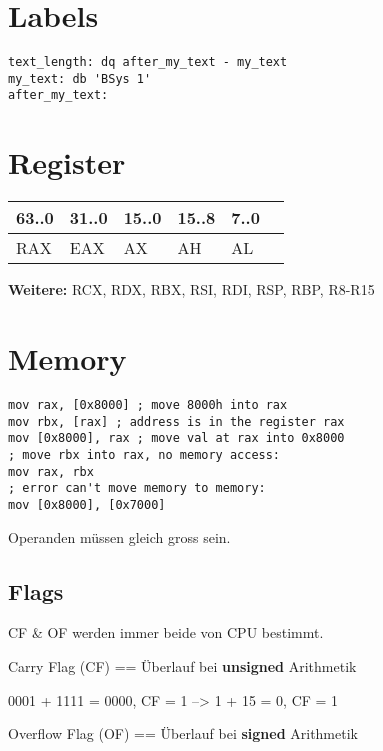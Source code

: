 \begin{multicols*}{4}
\section{Labels}
\begin{lstlisting}[language={[x86masm]Assembler}]
text_length: dq after_my_text - my_text
my_text: db 'BSys 1'
after_my_text:
\end{lstlisting}

\section{Register}
\begin{tabular}{llllll}
    63..0 & 31..0 & 15..0 & 15..8 & 7..0\\
    \hline
    RAX & EAX & AX & AH & AL\\
\end{tabular}

\textbf{Weitere:} RCX, RDX, RBX, RSI, RDI, RSP, RBP, R8-R15


\section{Memory}
\begin{lstlisting}[language={[x86masm]Assembler}]
mov rax, [0x8000] ; move 8000h into rax
mov rbx, [rax] ; address is in the register rax
mov [0x8000], rax ; move val at rax into 0x8000
; move rbx into rax, no memory access:
mov rax, rbx
; error can't move memory to memory:
mov [0x8000], [0x7000]
\end{lstlisting}
Operanden müssen gleich gross sein.


\subsection{Flags}
CF \& OF werden immer beide von CPU bestimmt.

Carry Flag (CF) == Überlauf bei \textbf{unsigned} Arithmetik

0001 + 1111 = 0000, CF = 1 --> 1 + 15 = 0, CF = 1

Overflow Flag (OF) == Überlauf bei \textbf{signed} Arithmetik


\end{multicols*}
